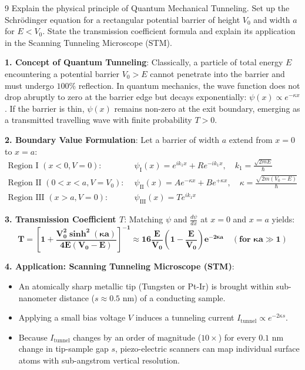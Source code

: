 \vspace{4mm}

\begin{theoryq}{9}
Explain the physical principle of Quantum Mechanical Tunneling. Set up the Schrödinger equation for a rectangular potential barrier of height $V_0$ and width $a$ for $E < V_0$. State the transmission coefficient formula and explain its application in the Scanning Tunneling Microscope (STM).
\end{theoryq}
\begin{theorysol}
\textbf{1. Concept of Quantum Tunneling}:
Classically, a particle of total energy $E$ encountering a potential barrier $V_0 > E$ cannot penetrate into the barrier and must undergo $100\%$ reflection.
In quantum mechanics, the wave function does not drop abruptly to zero at the barrier edge but decays exponentially: $\psi(x) \propto e^{-\kappa x}$. If the barrier is thin, $\psi(x)$ remains non-zero at the exit boundary, emerging as a transmitted travelling wave with finite probability $T > 0$.

\textbf{2. Boundary Value Formulation}:
Let a barrier of width $a$ extend from $x = 0$ to $x = a$:
\begin{align*}
\text{Region I } (x < 0, V=0): &\quad \psi_{\text{I}}(x) = e^{i k_1 x} + R e^{-i k_1 x}, \quad k_1 = \frac{\sqrt{2mE}}{\hbar} \\
\text{Region II } (0 < x < a, V=V_0): &\quad \psi_{\text{II}}(x) = A e^{-\kappa x} + B e^{+\kappa x}, \quad \kappa = \frac{\sqrt{2m(V_0 - E)}}{\hbar} \\
\text{Region III } (x > a, V=0): &\quad \psi_{\text{III}}(x) = T e^{i k_1 x}
\end{align*}

\textbf{3. Transmission Coefficient $T$}:
Matching $\psi$ and $\frac{d\psi}{dx}$ at $x = 0$ and $x = a$ yields:
\begin{equation}
\mathbf{T = \left[ 1 + \frac{V_0^2 \sinh^2(\kappa a)}{4E(V_0 - E)} \right]^{-1} \approx 16 \frac{E}{V_0}\left(1 - \frac{E}{V_0}\right)e^{-2\kappa a} \quad (\text{for } \kappa a \gg 1)}
\end{equation}

\textbf{4. Application: Scanning Tunneling Microscope (STM)}:
\begin{itemize}
    \item An atomically sharp metallic tip (Tungsten or Pt-Ir) is brought within sub-nanometer distance ($s \approx 0.5\text{ nm}$) of a conducting sample.
    \item Applying a small bias voltage $V$ induces a tunneling current $I_{\text{tunnel}} \propto e^{-2\kappa s}$.
    \item Because $I_{\text{tunnel}}$ changes by an order of magnitude ($10\times$) for every $0.1\text{ nm}$ change in tip-sample gap $s$, piezo-electric scanners can map individual surface atoms with sub-angstrom vertical resolution.
\end{itemize}
\end{theorysol}
\vspace{4mm}

